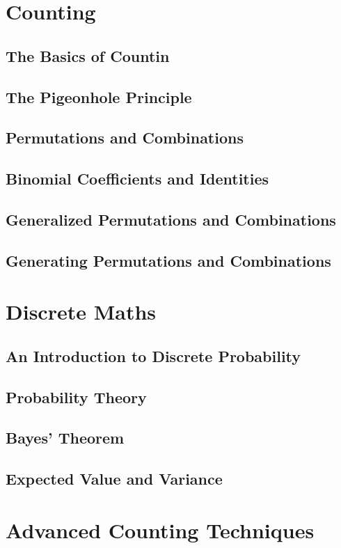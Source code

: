 \documentclass{article}
\begin{document}
\section{Counting}

\subsection{The Basics of Countin}
\subsection{The Pigeonhole Principle}
\subsection{Permutations and Combinations}
\subsection{Binomial Coefficients and Identities}
\subsection{Generalized Permutations and Combinations}
\subsection{Generating Permutations and Combinations}

\section{Discrete Maths}

\subsection{An Introduction to Discrete Probability}
\subsection{Probability Theory}
\subsection{Bayes’ Theorem}
\subsection{Expected Value and Variance}

\section{Advanced Counting Techniques}
\end{document}
